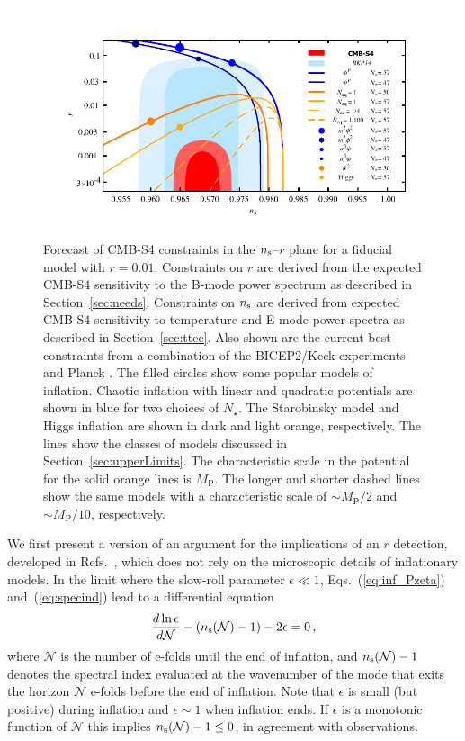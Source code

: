 \begin{figure}[ht]
\centering
\includegraphics[width=6in]{Inflation/nsrlabeledr0v3s}
\caption{Forecast of CMB-S4 constraints in the $n_{\rm s}$--$r$ plane for a fiducial model with $r=0.01$. Constraints 
on $r$ are derived from the expected CMB-S4 sensitivity to the B-mode power spectrum as described in 
Section~\ref{sec:needs}. Constraints on $n_{\rm s}$ are derived from expected CMB-S4 sensitivity to temperature and 
E-mode power spectra as described in Section~\ref{sec:ttee}. Also shown are the current best constraints from a combination of the BICEP2/Keck experiments and Planck \cite{Ade:2015fwj}. The filled circles show some popular models of inflation. Chaotic inflation with linear and quadratic potentials are shown in blue for two choices of $N_\star$. The Starobinsky model and Higgs inflation are shown in dark and light orange, respectively. The lines show the classes of models discussed in Section~\ref{sec:upperLimits}. The characteristic scale in the potential for the solid orange lines is $M_\text{P}$. The longer and shorter dashed lines show the same models with a characteristic scale of $\sim M_\text{P}/2$ and $\sim M_\text{P}/10$, respectively.
}
\label{fig:nsr0}
\end{figure}

We first present a version of an argument for the implications of an $r$ detection, developed in Refs.~\cite{Mukhanov:2013tua,Roest:2013fha,Creminelli:2014nqa}, which does not rely on the microscopic details of inflationary models. In the limit where the slow-roll parameter $\epsilon\ll1$, Eqs.~(\ref{eq:inf_Pzeta}) and~(\ref{eq:specind}) lead to a differential equation
\begin{equation}\label{eq:epsdiffeq}
\frac{d\ln\epsilon}{d\mathcal{N}}-(n_{\rm s}(\mathcal{N})-1)-2\epsilon=0\,,
\end{equation} 
where $\mathcal{N}$ is the number of e-folds until the end of inflation, and $n_{\rm s}(\mathcal{N})-1$ denotes the spectral index evaluated at the wavenumber of the mode that exits the horizon $\mathcal{N}$ e-folds before the end of inflation. Note that $\epsilon$ is small (but positive) during inflation and $\epsilon\sim 1$ when inflation ends. If $\epsilon$ is a monotonic function of $\mathcal{N}$ this implies $n_{\rm s}(\mathcal{N})-1\leq 0$, in agreement with observations. 


